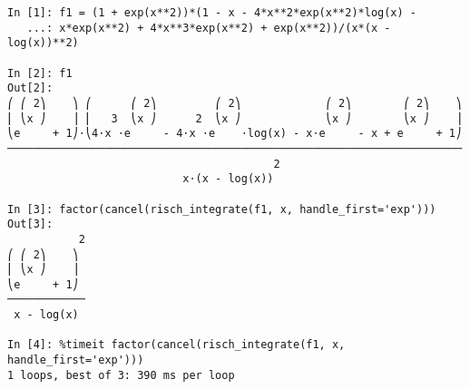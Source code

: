 ﻿\documentclass{article}
\begin{document}
\normalsize
\begin{Verbatim}
In [1]: f1 = (1 + exp(x**2))*(1 - x - 4*x**2*exp(x**2)*log(x) - 
   ...: x*exp(x**2) + 4*x**3*exp(x**2) + exp(x**2))/(x*(x - log(x))**2)

In [2]: f1
Out[2]: 
⎛ ⎛ 2⎞    ⎞ ⎛      ⎛ 2⎞         ⎛ 2⎞             ⎛ 2⎞        ⎛ 2⎞    ⎞
⎜ ⎝x ⎠    ⎟ ⎜   3  ⎝x ⎠      2  ⎝x ⎠             ⎝x ⎠        ⎝x ⎠    ⎟
⎝e     + 1⎠⋅⎝4⋅x ⋅e     - 4⋅x ⋅e    ⋅log(x) - x⋅e     - x + e     + 1⎠
──────────────────────────────────────────────────────────────────────
                                         2                            
                           x⋅(x - log(x))                             

In [3]: factor(cancel(risch_integrate(f1, x, handle_first='exp')))
Out[3]: 
           2
⎛ ⎛ 2⎞    ⎞ 
⎜ ⎝x ⎠    ⎟ 
⎝e     + 1⎠ 
────────────
 x - log(x) 

In [4]: %timeit factor(cancel(risch_integrate(f1, x, handle_first='exp')))
1 loops, best of 3: 390 ms per loop

\end{Verbatim}
\end{document}
